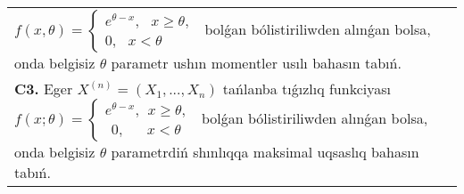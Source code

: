 \documentclass{article}
\begin{document}
\begin{tabular}{m{17cm}}
$
{f(x,\theta) = \left\{ \begin{array}{r}
e^{\theta - x},\ \ \ x \geq \theta, \\
0,\ \ \ x < \theta
\end{array} \right.\ }$
bolǵan bólistiriliwden alınǵan bolsa, onda belgisiz \(\theta\) parametr ushın momentler usılı bahasın tabıń.
 \\
\textbf{C3.} 
Eger \(X^{(n)} = \left( X_{1},...,X_{n} \right)\) tańlanba tıǵızlıq funkciyası
$f(x;\theta) = \left\{ \begin{matrix}
e^{\theta - x},\ \ x \geq \theta, \\
\ \ 0,\ \ \ \ \ \ \ x < \theta
\end{matrix} \right.\ $
bolǵan bólistiriliwden alınǵan bolsa, onda belgisiz \(\theta\) parametrdiń shınlıqqa maksimal uqsaslıq bahasın tabıń.
 \\

\end{tabular}
\vspace{1cm}
\end{document}
